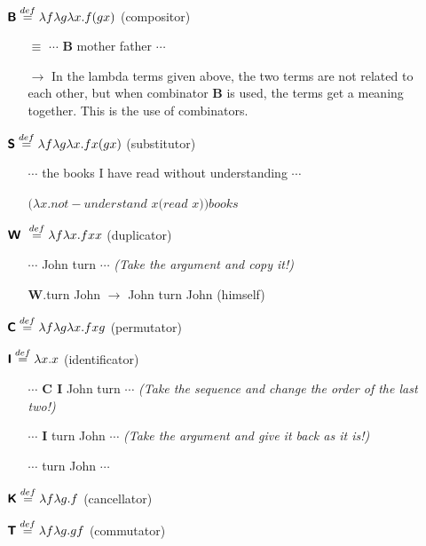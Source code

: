 \documentclass[12pt,a4paper]{article}
\begin{document}
\begin{itemize}
  \item[] $\textbf{\textsf{B}} \overset{def}{=} \lambda f\lambda g\lambda x.f(gx)$ (compositor)
  \begin{itemize}
  \item[$\equiv$]$\cdots$ \textbf{\textsf{B}} mother father $\cdots$
  \item[$\rightarrow$] In the lambda terms given above, the two terms are not related to each other, but when combinator \textbf{\textsf{B}} is used, the terms get a meaning together. This is the use of combinators.
  \end{itemize}
  \item[] $\textbf{\textsf{S}} \overset{def}{=} \lambda f\lambda g\lambda x.fx(gx)$ (substitutor)
  \begin{itemize}
  \item[] $\cdots$ the books I have read without understanding $\cdots$
  \item[] $(\lambda x.not-understand$ $x(read$ $x))books$ 
  \end{itemize}
  \item[] $\textbf{\textsf{W} }\overset{def}{=} \lambda f\lambda x.fxx$ (duplicator)
  \begin{itemize}
  \item[] $\cdots$ John turn  $\cdots$ \textit{(Take the argument and copy it!)}
  \item[] \textbf{\textsf{W}}.turn John $\rightarrow$ John turn John (himself)
  \end{itemize}
  \item[] $\textbf{\textsf{C}} \overset{def}{=} \lambda f\lambda g\lambda x.fxg$ (permutator)
  \item[] $\textbf{\textsf{I}} \overset{def}{=} \lambda x.x$ (identificator)
  \begin{itemize}
  \item[] $\cdots$ \textbf{\textsf{C I}} John turn $\cdots$ \textit{(Take the sequence and change the order of the last two!)}
  \item[] $\cdots$ \textbf{\textsf{I}} turn John $\cdots$ \textit{(Take the argument and give it back as it is!)}
  \item[] $\cdots$ turn John $\cdots$
  \end{itemize}
  \item[] $\textbf{\textsf{K}} \overset{def}{=} \lambda f\lambda g.f$ (cancellator)
  \item[] $\textbf{\textsf{T}} \overset{def}{=} \lambda f\lambda g.gf$ (commutator)
\end{itemize}
\vspace{1cm}
\end{document}
